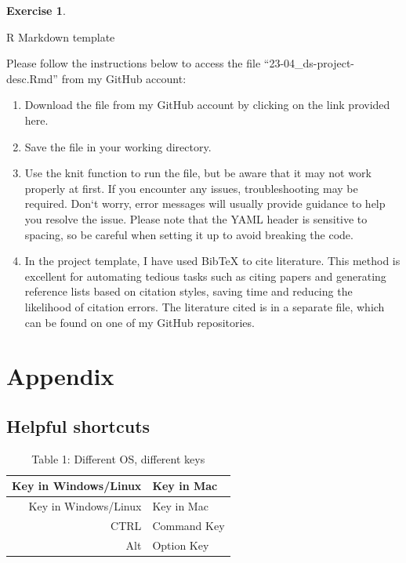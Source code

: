 \documentclass[
  12pt,
  oneside]{book}
\providecommand{\tightlist}{%
  \setlength{\itemsep}{0pt}\setlength{\parskip}{0pt}}
\theoremstyle{definition}
\theoremstyle{definition}
\theoremstyle{definition}
\newtheorem{exercise}{Exercise}[chapter]
\theoremstyle{definition}
\theoremstyle{remark}
\begin{document}
\begin{exercise}
\protect\hypertarget{exr:rmdsecond}{}\label{exr:rmdsecond}

R Markdown template

Please follow the instructions below to access the file ``23-04\_ds-project-desc.Rmd'' from my GitHub account:

\begin{enumerate}
\def\labelenumi{\arabic{enumi}.}
\tightlist
\item
  Download the file from my GitHub account by clicking on the link provided here.
\item
  Save the file in your working directory.
\item
  Use the knit function to run the file, but be aware that it may not work properly at first. If you encounter any issues, troubleshooting may be required. Don`t worry, error messages will usually provide guidance to help you resolve the issue. Please note that the YAML header is sensitive to spacing, so be careful when setting it up to avoid breaking the code.
\item
  In the project template, I have used BibTeX to cite literature. This method is excellent for automating tedious tasks such as citing papers and generating reference lists based on citation styles, saving time and reducing the likelihood of citation errors. The literature cited is in a separate file, which can be found on one of my GitHub repositories.
\end{enumerate}

\end{exercise}

\hypertarget{appendix}{%
\chapter{Appendix}\label{appendix}}

\hypertarget{helpful-shortcuts}{%
\section{Helpful shortcuts}\label{helpful-shortcuts}}

\begin{longtable}[]{@{}rl@{}}
\caption{Table 1: Different OS, different keys}\tabularnewline
\toprule()
Key in Windows/Linux & Key in Mac \\
\midrule()
\endfirsthead
\toprule()
Key in Windows/Linux & Key in Mac \\
\midrule()
\endhead
CTRL & Command Key \\
Alt & Option Key \\
\bottomrule()
\end{longtable}
\end{document}
